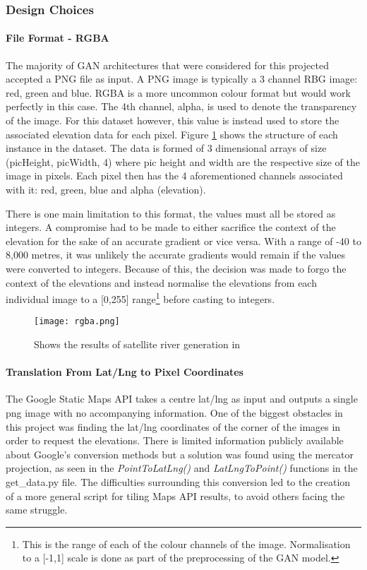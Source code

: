 \documentclass[a4paper]{report}
\begin{document}
\subsubsection{Design Choices}
\paragraph{File Format - RGBA}
The majority of GAN architectures that were considered for this projected accepted a PNG file as input. A PNG image is typically a 3 channel RBG image: red, green and blue. RGBA is a more uncommon colour format but would work perfectly in this case. The 4th channel, alpha, is used to denote the transparency of the image. For this dataset however, this value is instead used to store the associated elevation data for each pixel. Figure \ref{fig:rgba} shows the structure of each instance in the dataset. The data is formed of 3 dimensional arrays of size (picHeight, picWidth, 4) where pic height and width are the respective size of the image in pixels. Each pixel then has the 4 aforementioned channels associated with it: red, green, blue and alpha (elevation).

There is one main limitation to this format, the values must all be stored as integers. A compromise had to be made to either sacrifice the context of the elevation for the sake of an accurate gradient or vice versa. With a range of -40 to 8,000 metres, it was unlikely the accurate gradients would remain if the values were converted to integers. Because of this, the decision was made to forgo the context of the elevations and instead normalise the elevations from each individual image to a [0,255] range\footnote{This is the range of each of the colour channels of the image. Normalisation to a [-1,1] scale is done as part of the preprocessing of the GAN model.} before casting to integers.

\begin{figure}[H]
    \centering
        \texttt{[image: rgba.png]}
        \caption{Shows the results of satellite river generation in}
        \label{fig:rgba}
\end{figure}

\paragraph{Translation From Lat/Lng to Pixel Coordinates}
The Google Static Maps API takes a centre lat/lng as input and outputs a single png image with no accompanying information. One of the biggest obstacles in this project was finding the lat/lng coordinates of the corner of the images in order to request the elevations. There is limited information publicly available about Google's conversion methods but a solution was found using the mercator projection, as seen in the \textit{PointToLatLng()} and \textit{LatLngToPoint()} functions in the get\_data.py file.
The difficulties surrounding this conversion led to the creation of a more general script \cite{ToDo} for tiling Maps API results, to avoid others facing the same struggle.
\end{document}
